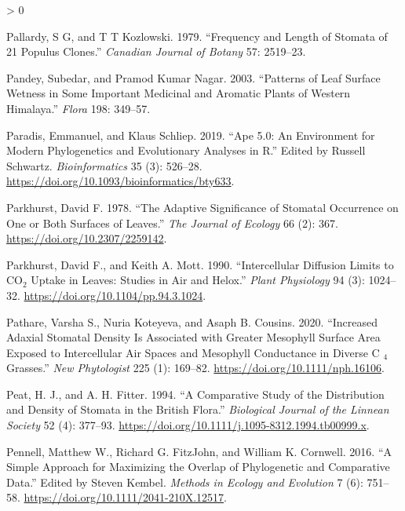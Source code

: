 \documentclass[
  10pt,
]{article}
\newlength{\cslhangindent}
\newenvironment{CSLReferences}[2] %
 {%
  \setlength{\parindent}{0pt}
  \ifodd #1 \everypar{\setlength{\hangindent}{\cslhangindent}}\ignorespaces\fi
  \ifnum #2 > 0
  \setlength{\parskip}{#2\baselineskip}
  \fi
 }%
 {}
\begin{document}
\begin{CSLReferences}{1}{0}
\leavevmode\hypertarget{ref-pallardy_frequency_1979}{}%
Pallardy, S G, and T T Kozlowski. 1979. {``Frequency and Length of Stomata of 21 {Populus} Clones.''} \emph{Canadian Journal of Botany} 57: 2519--23.

\leavevmode\hypertarget{ref-pandey_patterns_2003}{}%
Pandey, Subedar, and Pramod Kumar Nagar. 2003. {``Patterns of Leaf Surface Wetness in Some Important Medicinal and Aromatic Plants of {Western} {Himalaya}.''} \emph{Flora} 198: 349--57.

\leavevmode\hypertarget{ref-paradis_ape_2019}{}%
Paradis, Emmanuel, and Klaus Schliep. 2019. {``Ape 5.0: An Environment for Modern Phylogenetics and Evolutionary Analyses in {R}.''} Edited by Russell Schwartz. \emph{Bioinformatics} 35 (3): 526--28. \url{https://doi.org/10.1093/bioinformatics/bty633}.

\leavevmode\hypertarget{ref-parkhurst_adaptive_1978}{}%
Parkhurst, David F. 1978. {``The Adaptive Significance of Stomatal Occurrence on One or Both Surfaces of Leaves.''} \emph{The Journal of Ecology} 66 (2): 367. \url{https://doi.org/10.2307/2259142}.

\leavevmode\hypertarget{ref-parkhurst_intercellular_1990}{}%
Parkhurst, David F., and Keith A. Mott. 1990. {``Intercellular Diffusion Limits to {CO}\(_{\textrm{2}}\) Uptake in Leaves: Studies in Air and Helox.''} \emph{Plant Physiology} 94 (3): 1024--32. \url{https://doi.org/10.1104/pp.94.3.1024}.

\leavevmode\hypertarget{ref-pathare_increased_2020}{}%
Pathare, Varsha S., Nuria Koteyeva, and Asaph B. Cousins. 2020. {``Increased Adaxial Stomatal Density Is Associated with Greater Mesophyll Surface Area Exposed to Intercellular Air Spaces and Mesophyll Conductance in Diverse {C} \(_{\textrm{4}}\) Grasses.''} \emph{New Phytologist} 225 (1): 169--82. \url{https://doi.org/10.1111/nph.16106}.

\leavevmode\hypertarget{ref-peat_comparative_1994}{}%
Peat, H. J., and A. H. Fitter. 1994. {``A Comparative Study of the Distribution and Density of Stomata in the {British} Flora.''} \emph{Biological Journal of the Linnean Society} 52 (4): 377--93. \url{https://doi.org/10.1111/j.1095-8312.1994.tb00999.x}.

\leavevmode\hypertarget{ref-pennell_simple_2016}{}%
Pennell, Matthew W., Richard G. FitzJohn, and William K. Cornwell. 2016. {``A Simple Approach for Maximizing the Overlap of Phylogenetic and Comparative Data.''} Edited by Steven Kembel. \emph{Methods in Ecology and Evolution} 7 (6): 751--58. \url{https://doi.org/10.1111/2041-210X.12517}.


\end{CSLReferences}
\end{document}
